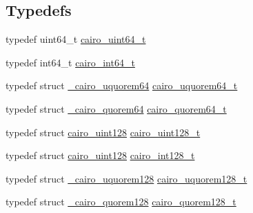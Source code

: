 \subsection*{Typedefs}
\begin{DoxyCompactItemize}
\item 
typedef uint64\+\_\+t \hyperlink{cairo-wideint-private_8h_addac97960d28a0f1b58a5abefd21b14b}{cairo\+\_\+uint64\+\_\+t}
\item 
typedef int64\+\_\+t \hyperlink{cairo-wideint-private_8h_a31b93307f43703e28eef43fad0166834}{cairo\+\_\+int64\+\_\+t}
\item 
typedef struct \hyperlink{struct__cairo__uquorem64}{\+\_\+cairo\+\_\+uquorem64} \hyperlink{cairo-wideint-private_8h_aab2ad7e0f3441227d9339be2baa8b986}{cairo\+\_\+uquorem64\+\_\+t}
\item 
typedef struct \hyperlink{struct__cairo__quorem64}{\+\_\+cairo\+\_\+quorem64} \hyperlink{cairo-wideint-private_8h_af1cd8d1d4bd4c1ec92c27c22e8f0123b}{cairo\+\_\+quorem64\+\_\+t}
\item 
typedef struct \hyperlink{structcairo__uint128}{cairo\+\_\+uint128} \hyperlink{cairo-wideint-private_8h_ab99b9c539c5f08b381ec3797b3fcd872}{cairo\+\_\+uint128\+\_\+t}
\item 
typedef struct \hyperlink{structcairo__uint128}{cairo\+\_\+uint128} \hyperlink{cairo-wideint-private_8h_adb77a91a0053b771957b37c1a822a228}{cairo\+\_\+int128\+\_\+t}
\item 
typedef struct \hyperlink{struct__cairo__uquorem128}{\+\_\+cairo\+\_\+uquorem128} \hyperlink{cairo-wideint-private_8h_a91a3ca00de0cbe259e8d71bd506ab467}{cairo\+\_\+uquorem128\+\_\+t}
\item 
typedef struct \hyperlink{struct__cairo__quorem128}{\+\_\+cairo\+\_\+quorem128} \hyperlink{cairo-wideint-private_8h_add8480e15fd3504eb477a983263f0313}{cairo\+\_\+quorem128\+\_\+t}
\end{DoxyCompactItemize}
